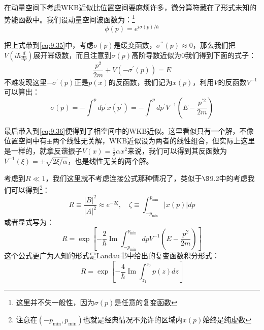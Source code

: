 \documentclass[a4paper,zihao=-4,linespread=1]{ctexrep}
\begin{document}
	在动量空间下考虑WKB近似比位置空间要麻烦许多，微分算符藏在了形式未知的势能函数中。我们设动量空间波函数为：\footnote{这里并不失一般性，因为$\sigma(p)$是任意的复变函数}
	\begin{equation}
		\label{eq:9.36}
		\phi(p)=e^{i\sigma(p)/\hbar}
	\end{equation}
	
	把上式带到\ref{eq:9.35}中，考虑$\sigma(p)$是缓变函数，$\sigma^{\prime\prime}(p)\approx 0$，那么我们把$V(i\hbar\frac{d}{dp})$展开幂级数，而且注意到$\sigma(p)$高阶导数近似为$0$我们得到下面的式子：
	\begin{equation}
		\frac{p^2}{2m}+V(-\sigma^{\prime}(p))=E
	\end{equation}
	不难发现这里$-\sigma^{\prime}(p)$正是$p(x)$的反函数，我们记为$x(p)$，利用$V$的反函数$V^{-1}$可以算出：
	\begin{equation}
		\sigma(p)=-\int^{p} d p^{\prime} x\left(p^{\prime}\right)=-\int^{p} d p^{\prime} V^{-1}\left(E-\frac{p^{\prime 2}}{2 m}\right)
	\end{equation}
	
	最后带入到\ref{eq:9.36}便得到了相空间中的WKB近似。这里看似只有一个解，不像位置空间中有$\pm$两个线性无关解，WKB近似设为两者的线性组合，但实际上这里是一样的，就拿反谐振子$V(x)=\frac{1}{2}\alpha x^2$来说，我们可以得到其反函数为$V^{-1}(\xi)=\pm\sqrt{2\xi/\alpha}$，也是线性无关的两个解。
	
	考虑到$R\ll 1$，我们这里就不考虑连接公式那种情况了，类似于$\S$9.2中的考虑我们可以得到\footnote{注意在$(-p_{\min},p_{\min})$也就是经典情况不允许的区域内$x(p)$始终是纯虚数}：
	\begin{equation}
		\boxed{
		R\equiv \frac{|B|^2}{|A|^2}\approx e^{-2\zeta},\quad \zeta\equiv\int_{-p_{\min}}^{p_{\min}}|x(p)|dp}
	\end{equation}
	或者显式写为：
	\begin{equation}
		\label{eq:9.40}
		\boxed{
		R=\exp \left[-\frac{2}{\hbar} \operatorname{Im} \int_{-p_{\min }}^{p_{\min }} d p V^{-1}\left(E-\frac{p^{2}}{2 m}\right)\right]	
	}
	\end{equation}
	这个公式更广为人知的形式是Landau书中给出的复变函数积分形式：
	\begin{equation}
		\label{eq:9.41}
		\boxed{
		R=\exp \left[-\frac{4}{\hbar} \operatorname{Im} \int_{z_{1}}^{z_{0}}  p(z)dz\right]
	}
	\end{equation}
\end{document}
